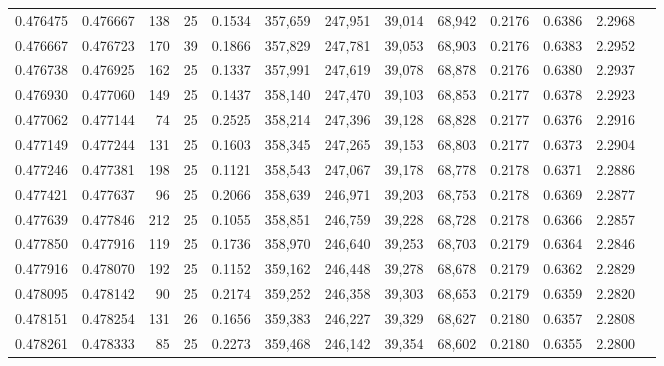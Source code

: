 \begin{tabular}{rrrrrrrrrrrrr}
0.476475 & 0.476667 &    138 &    25 &                                     0.1534 & 357,659 & 247,951 &  39,014 &  68,942 & 0.2176 & 0.6386 & 2.2968 \\
0.476667 & 0.476723 &    170 &    39 &                                     0.1866 & 357,829 & 247,781 &  39,053 &  68,903 & 0.2176 & 0.6383 & 2.2952 \\
0.476738 & 0.476925 &    162 &    25 &                                     0.1337 & 357,991 & 247,619 &  39,078 &  68,878 & 0.2176 & 0.6380 & 2.2937 \\
0.476930 & 0.477060 &    149 &    25 &                                     0.1437 & 358,140 & 247,470 &  39,103 &  68,853 & 0.2177 & 0.6378 & 2.2923 \\
0.477062 & 0.477144 &     74 &    25 &                                     0.2525 & 358,214 & 247,396 &  39,128 &  68,828 & 0.2177 & 0.6376 & 2.2916 \\
0.477149 & 0.477244 &    131 &    25 &                                     0.1603 & 358,345 & 247,265 &  39,153 &  68,803 & 0.2177 & 0.6373 & 2.2904 \\
0.477246 & 0.477381 &    198 &    25 &                                     0.1121 & 358,543 & 247,067 &  39,178 &  68,778 & 0.2178 & 0.6371 & 2.2886 \\
0.477421 & 0.477637 &     96 &    25 &                                     0.2066 & 358,639 & 246,971 &  39,203 &  68,753 & 0.2178 & 0.6369 & 2.2877 \\
0.477639 & 0.477846 &    212 &    25 &                                     0.1055 & 358,851 & 246,759 &  39,228 &  68,728 & 0.2178 & 0.6366 & 2.2857 \\
0.477850 & 0.477916 &    119 &    25 &                                     0.1736 & 358,970 & 246,640 &  39,253 &  68,703 & 0.2179 & 0.6364 & 2.2846 \\
0.477916 & 0.478070 &    192 &    25 &                                     0.1152 & 359,162 & 246,448 &  39,278 &  68,678 & 0.2179 & 0.6362 & 2.2829 \\
0.478095 & 0.478142 &     90 &    25 &                                     0.2174 & 359,252 & 246,358 &  39,303 &  68,653 & 0.2179 & 0.6359 & 2.2820 \\
0.478151 & 0.478254 &    131 &    26 &                                     0.1656 & 359,383 & 246,227 &  39,329 &  68,627 & 0.2180 & 0.6357 & 2.2808 \\
0.478261 & 0.478333 &     85 &    25 &                                     0.2273 & 359,468 & 246,142 &  39,354 &  68,602 & 0.2180 & 0.6355 & 2.2800 \\

\end{tabular}
